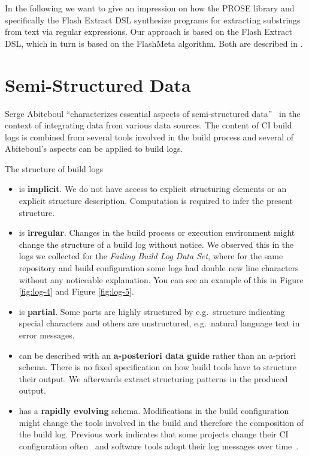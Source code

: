 \documentclass[\myrootdir/main.tex]{subfiles}
\begin{document}
In the following we want to give an impression on how the PROSE library and specifically the Flash Extract DSL synthesize programs for extracting substrings from text via regular expressions.
Our approach is based on the Flash Extract DSL, which in turn is based on the FlashMeta algorithm. Both are described in .

\section{Semi-Structured Data}
\label{sec:rw-semi-structured-data}
Serge Abiteboul ``characterizes essential aspects of semi-structured data''~\cite{abiteboul1997querying} in the context of integrating data from various data sources.
The content of CI build logs is combined from several tools involved in the build process and several of Abiteboul's aspects can be applied to build logs.

The structure of build logs
\begin{itemize}
  \item is \textbf{implicit}.
  We do not have access to explicit structuring elements or an explicit structure description.
  Computation is required to infer the present structure.
  \item is \textbf{irregular}.
  Changes in the build process or execution environment might change the structure of a build log without notice.
  We observed this in the logs we collected for the \emph{Failing Build Log Data Set}, where for the same repository and build configuration some logs had double new line characters without any noticeable explanation.
  You can see an example of this in Figure \ref{fig:log-4} and Figure \ref{fig:log-5}.
  \item is \textbf{partial}. Some parts are highly structured by e.g.\ structure indicating special characters and others are unstructured, e.g.\ natural language text in error messages.
  \item can be described with an \textbf{a-posteriori data guide} rather than an a-priori schema.
  There is no fixed specification on how build tools have to structure their output.
  We afterwards extract structuring patterns in the produced output.
  \item has a \textbf{rapidly evolving} schema.
  Modifications in the build configuration might change the tools involved in the build and therefore the composition of the build log.
  Previous work indicates that some projects change their CI configuration often~\cite{hilton2016usage} and software tools adopt their log messages over time~\cite{yuan2012characterizing}.
\end{itemize}
\end{document}
